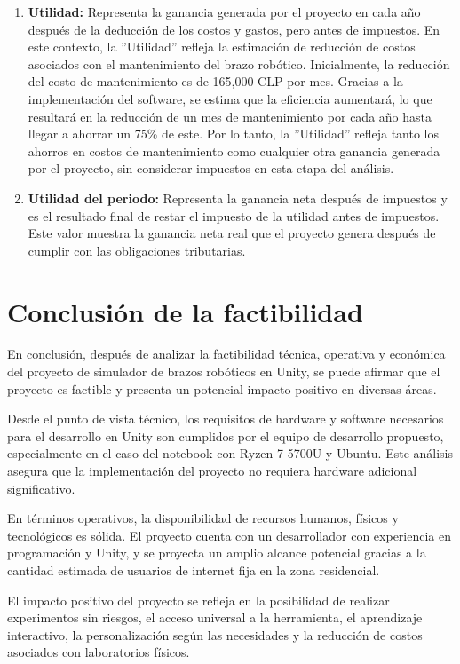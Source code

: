\begin{enumerate}[label=\arabic*.]
    \item \textbf{Utilidad:} Representa la ganancia generada por el proyecto en cada año después de la deducción de los costos y gastos, pero antes de impuestos. En este contexto, la ''Utilidad'' refleja la estimación de reducción de costos asociados con el mantenimiento del brazo robótico. Inicialmente, la reducción del costo de mantenimiento es de 165,000 CLP por mes. Gracias a la implementación del software, se estima que la eficiencia aumentará, lo que resultará en la reducción de un mes de mantenimiento por cada año hasta llegar a ahorrar un 75\% de este. Por lo tanto, la ''Utilidad'' refleja tanto los ahorros en costos de mantenimiento como cualquier otra ganancia generada por el proyecto, sin considerar impuestos en esta etapa del análisis.
    
    \item \textbf{Utilidad del periodo:} Representa la ganancia neta después de impuestos y es el resultado final de restar el impuesto de la utilidad antes de impuestos. Este valor muestra la ganancia neta real que el proyecto genera después de cumplir con las obligaciones tributarias.
\end{enumerate}

\clearpage
\section{Conclusión de la factibilidad}

En conclusión, después de analizar la factibilidad técnica, operativa y económica del proyecto de simulador de brazos robóticos en Unity, se puede afirmar que el proyecto es factible y presenta un potencial impacto positivo en diversas áreas.

Desde el punto de vista técnico, los requisitos de hardware y software necesarios para el desarrollo en Unity son cumplidos por el equipo de desarrollo propuesto, especialmente en el caso del notebook con Ryzen 7 5700U y Ubuntu. Este análisis asegura que la implementación del proyecto no requiera hardware adicional significativo.

En términos operativos, la disponibilidad de recursos humanos, físicos y tecnológicos es sólida. El proyecto cuenta con un desarrollador con experiencia en programación y Unity, y se proyecta un amplio alcance potencial gracias a la cantidad estimada de usuarios de internet fija en la zona residencial.

El impacto positivo del proyecto se refleja en la posibilidad de realizar experimentos sin riesgos, el acceso universal a la herramienta, el aprendizaje interactivo, la personalización según las necesidades y la reducción de costos asociados con laboratorios físicos.

